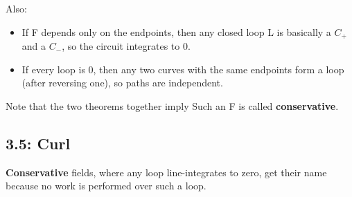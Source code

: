 \documentclass[11pt, oneside]{article}   	%
\begin{document}
Also: 


\begin{itemize}
\item If F depends only on the endpoints, then any closed loop L is basically a $C_+$ and a $C_-$, so the circuit integrates to 0.
\item If every loop is 0, then any two curves with the same endpoints form a loop (after reversing one), so paths are independent. 
\end{itemize}

Note that the two theorems together imply   Such an F is called \textbf{conservative}.

\subsection{3.5: Curl}

\textbf{Conservative} fields, where any loop line-integrates to zero, get their name because no work is performed over such a loop. 
\end{document}
